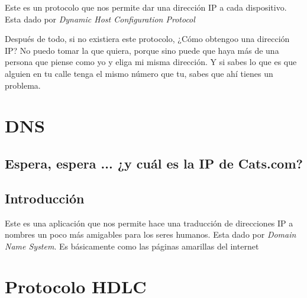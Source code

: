 \documentclass[12pt, fleqn]{report}                             %
\theoremstyle{break}                                            %
\begin{document}
            Este es un protocolo que nos permite dar una dirección IP a cada dispositivo.
            Esta dado por \emph{Dynamic Host Configuration Protocol}

            Después de todo, si no existiera este protocolo, ¿Cómo obtengoo una dirección IP?
            No puedo tomar la que quiera, porque sino puede que haya más de una persona que piense
            como yo y eliga mi misma dirección.
            Y si sabes lo que es que alguien en tu calle tenga el mismo número que tu, sabes que 
            ahí tienes un problema.


    \chapter{DNS}
    \section*{Espera, espera ... ¿y cuál es la IP de Cats.com?}


        \clearpage
        \section{Introducción}

            Este es una aplicación que nos permite hace una traducción de direcciones IP a
            nombres un poco más amigables para los seres humanos.
            Esta dado por \emph{Domain Name System}. Es básicamente como las páginas
            amarillas del internet




    \chapter{Protocolo HDLC}
\end{document}
